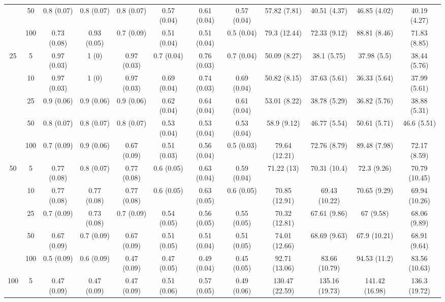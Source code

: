 \documentclass[11pt,3p,review,authoryear]{elsarticle}
\theoremstyle{definition}
\begin{document}
\begin{landscape}
\begin{table}[b]
\begin{center}
{\begin{tabular}{cc|ccc|ccc|cccc|}
    & 50  & 0.8 (0.07) & 0.8 (0.07) & 0.8 (0.07) & 0.57 (0.04) & 0.61 (0.04) & 0.57 (0.04) & 57.82 (7.81) & 40.51 (4.37) & 46.85 (4.02) & 40.19 (4.27) \\ 
    & 100  & 0.73 (0.08) & 0.93 (0.05) & 0.7 (0.09) & 0.51 (0.04) & 0.51 (0.04) & 0.5 (0.04) & 79.3 (12.44) & 72.33 (9.12) & 88.81 (8.46) & 71.83 (8.85) \\[.3cm] 
   \multirow{5}{*}{25} & 5  & 0.97 (0.03) & 1 (0) & 0.97 (0.03) & 0.7 (0.04) & 0.76 (0.03) & 0.7 (0.04) & 50.09 (8.27) & 38.1 (5.75) & 37.98 (5.5) & 38.44 (5.76) \\ 
    & 10  & 0.97 (0.03) & 1 (0) & 0.97 (0.03) & 0.69 (0.04) & 0.74 (0.03) & 0.69 (0.04) & 50.82 (8.15) & 37.63 (5.61) & 36.33 (5.64) & 37.99 (5.61) \\ 
    & 25  & 0.9 (0.06) & 0.9 (0.06) & 0.9 (0.06) & 0.62 (0.04) & 0.64 (0.04) & 0.61 (0.04) & 53.01 (8.22) & 38.78 (5.29) & 36.82 (5.76) & 38.88 (5.31) \\ 
    & 50  & 0.8 (0.07) & 0.8 (0.07) & 0.8 (0.07) & 0.53 (0.04) & 0.53 (0.04) & 0.53 (0.04) & 58.9 (9.12) & 46.77 (5.54) & 50.61 (5.71) & 46.6 (5.51) \\ 
    & 100  & 0.7 (0.09) & 0.9 (0.06) & 0.67 (0.09) & 0.51 (0.03) & 0.56 (0.04) & 0.5 (0.03) & 79.64 (12.21) & 72.76 (8.79) & 89.48 (7.98) & 72.17 (8.59) \\[.3cm] 
   \multirow{5}{*}{50} & 5  & 0.77 (0.08) & 0.8 (0.07) & 0.77 (0.08) & 0.6 (0.05) & 0.63 (0.04) & 0.59 (0.04) & 71.22 (13) & 70.31 (10.4) & 72.3 (9.26) & 70.79 (10.45) \\ 
    & 10  & 0.77 (0.08) & 0.77 (0.08) & 0.77 (0.08) & 0.6 (0.05) & 0.63 (0.05) & 0.6 (0.05) & 70.85 (12.91) & 69.43 (10.22) & 70.65 (9.29) & 69.94 (10.26) \\ 
    & 25  & 0.7 (0.09) & 0.73 (0.08) & 0.7 (0.09) & 0.54 (0.05) & 0.56 (0.05) & 0.55 (0.05) & 70.32 (12.81) & 67.61 (9.86) & 67 (9.58) & 68.06 (9.89) \\ 
    & 50  & 0.67 (0.09) & 0.7 (0.09) & 0.67 (0.09) & 0.51 (0.05) & 0.51 (0.04) & 0.51 (0.05) & 74.01 (12.66) & 68.69 (9.63) & 67.9 (10.21) & 68.91 (9.64) \\ 
    & 100  & 0.5 (0.09) & 0.6 (0.09) & 0.47 (0.09) & 0.47 (0.05) & 0.49 (0.04) & 0.45 (0.05) & 92.71 (13.06) & 83.66 (10.79) & 94.53 (11.2) & 83.56 (10.63)\\[.3cm] 
   \multirow{5}{*}{100} & 5  & 0.47 (0.09) & 0.47 (0.09) & 0.47 (0.09) & 0.51 (0.06) & 0.57 (0.05) & 0.49 (0.06) & 130.47 (22.59) & 135.16 (19.73) & 141.42 (16.98) & 136.3 (19.72) \\ 

\end{tabular}}
\end{center}
\end{table}
\end{landscape}
\end{document}
